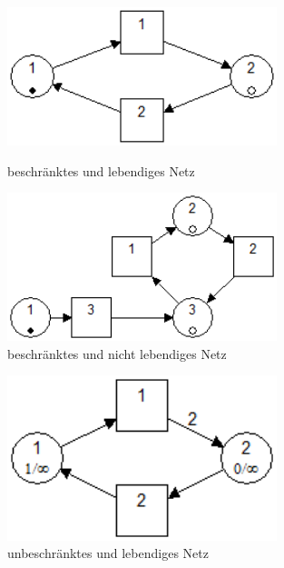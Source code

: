\documentclass[10pt]{scrartcl}
\begin{document}
\begin{enumerate}
\begin{figure}
\begin{minipage}[hbt]{7cm}
	\centering
	\includegraphics[width=0.7\textwidth]{Bilder/2_Beschraenkt_und_Lebendig.png}
	\caption{beschränktes und lebendiges Netz}
	\label{fig:BL}
\end{minipage}
\hfill
\begin{minipage}[hbt]{7cm}
	\centering
	\includegraphics[width=0.7\textwidth]{Bilder/2_Beschraenkt_nicht_Lebendig.png}
	\caption{beschränktes und nicht lebendiges Netz}
	\label{fig:BnL}
\end{minipage}
\end{figure}
\begin{figure}
\begin{minipage}[hbt]{7cm}
	\centering
	\includegraphics[width=0.7\textwidth]{Bilder/2_Nicht_Beschraenkt_und_Lebendig.png}
	\caption{unbeschränktes und lebendiges Netz}
	\label{fig:nBL}
\end{minipage}
\hfill
\begin{minipage}[hbt]{7cm}

\end{minipage}
\end{figure}
\end{enumerate}
\end{document}
